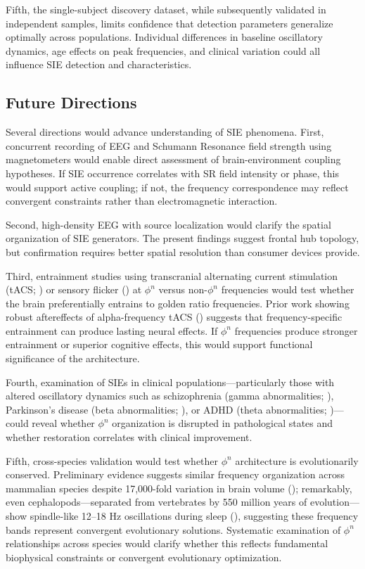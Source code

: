 \documentclass[11pt,a4paper]{article}
\begin{document}
Fifth, the single-subject discovery dataset, while subsequently validated in independent samples, limits confidence that detection parameters generalize optimally across populations. Individual differences in baseline oscillatory dynamics, age effects on peak frequencies, and clinical variation could all influence SIE detection and characteristics.

\subsection{Future Directions}

Several directions would advance understanding of SIE phenomena. First, concurrent recording of EEG and Schumann Resonance field strength using magnetometers would enable direct assessment of brain-environment coupling hypotheses. If SIE occurrence correlates with SR field intensity or phase, this would support active coupling; if not, the frequency correspondence may reflect convergent constraints rather than electromagnetic interaction.

Second, high-density EEG with source localization would clarify the spatial organization of SIE generators. The present findings suggest frontal hub topology, but confirmation requires better spatial resolution than consumer devices provide.

Third, entrainment studies using transcranial alternating current stimulation (tACS; \cite{herrmann2016eeg, pogosyan2009boosting}) or sensory flicker (\cite{galambos1981human}) at $\phi^n$ versus non-$\phi^n$ frequencies would test whether the brain preferentially entrains to golden ratio frequencies. Prior work showing robust aftereffects of alpha-frequency tACS (\cite{zaehle2010alpha, kasten2016sustaining}) suggests that frequency-specific entrainment can produce lasting neural effects. If $\phi^n$ frequencies produce stronger entrainment or superior cognitive effects, this would support functional significance of the architecture.

Fourth, examination of SIEs in clinical populations—particularly those with altered oscillatory dynamics such as schizophrenia (gamma abnormalities; \cite{uhlhaas2008role, kwon1999gamma}), Parkinson's disease (beta abnormalities; \cite{brown2007basal, little2013movement}), or ADHD (theta abnormalities; \cite{barry2003review})—could reveal whether $\phi^n$ organization is disrupted in pathological states and whether restoration correlates with clinical improvement.

Fifth, cross-species validation would test whether $\phi^n$ architecture is evolutionarily conserved. Preliminary evidence suggests similar frequency organization across mammalian species despite 17,000-fold variation in brain volume (\cite{buzsaki2013scaling}); remarkably, even cephalopods—separated from vertebrates by 550 million years of evolution—show spindle-like 12–18 Hz oscillations during sleep (\cite{medendorp2024octopus}), suggesting these frequency bands represent convergent evolutionary solutions. Systematic examination of $\phi^n$ relationships across species would clarify whether this reflects fundamental biophysical constraints or convergent evolutionary optimization.
\end{document}
